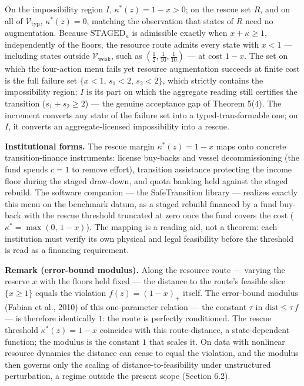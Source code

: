 \documentclass[3p,11pt]{elsarticle}
\begin{document}
On the impossibility region \(I\), \(\kappa^*(z) = 1 - x > 0\); on the rescue set \(R\), and on all of \(\mathcal{V}_{\mathrm{typ}}\), \(\kappa^*(z) = 0\), matching the observation that states of \(R\) need no augmentation. Because \(\mathrm{STAGED}_\kappa\) is admissible exactly when \(x + \kappa \ge 1\), independently of the floors, the resource route admits every state with \(x < 1\) --- including states outside \(\mathcal{V}_{\mathrm{weak}}\), such as \((\tfrac12, \tfrac1{10}, \tfrac1{10})\) --- at cost \(1 - x\). The set on which the four-action menu fails yet resource augmentation succeeds at finite cost is the full failure set \(\{x < 1,\, s_1 < 2,\, s_2 < 2\}\), which strictly contains the impossibility region; \(I\) is its part on which the aggregate reading still certifies the transition (\(s_1 + s_2 \ge 2\)) --- the genuine acceptance gap of Theorem 5(4). The increment converts any state of the failure set into a typed-transformable one; on \(I\), it converts an aggregate-licensed impossibility into a rescue.


\textbf{Institutional forms.} The rescue margin \(\kappa^*(z) = 1 - x\)
maps onto concrete transition-finance instruments: license buy-backs and
vessel decommissioning (the fund spends \(c = 1\) to remove effort),
transition assistance protecting the income floor during the staged
draw-down, and quota banking held against the staged rebuild. The
software companion --- the SafeTransition library --- realizes exactly
this menu on the benchmark datum, as a staged rebuild financed by a fund
buy-back with the rescue threshold truncated at zero once the fund covers
the cost (\(\kappa^* = \max(0,\, 1 - x)\)). The mapping is a reading
aid, not a theorem: each institution must verify its own physical and
legal feasibility before the threshold is read as a financing requirement.

\textbf{Remark (error-bound modulus).} Along the resource route --- varying the reserve \(x\) with the floors held fixed --- the distance to the route's feasible slice \(\{x \ge 1\}\) equals the violation \(f(z) = (1 - x)_+\) itself. The error-bound modulus (Fabian et al., 2010) of this one-parameter relation --- the constant \(\tau\) in \(\mathrm{dist} \le \tau\, f\) --- is therefore identically \(1\): the route is perfectly conditioned. The rescue threshold \(\kappa^*(z) = 1 - x\) coincides with this route-distance, a state-dependent function; the modulus is the constant \(1\) that scales it. On data with nonlinear resource dynamics the distance can cease to equal the violation, and the modulus then governs only the scaling of distance-to-feasibility under unstructured perturbation, a regime outside the present scope (Section 6.2).
\end{document}
